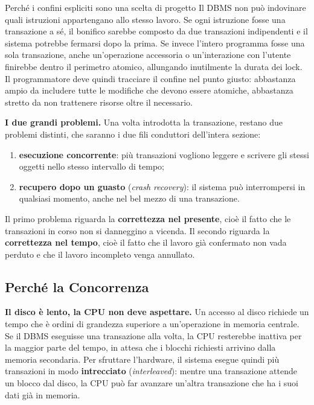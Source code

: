 \documentclass[12pt]{extarticle}
\begin{document}
\begin{cbox}{Perché i confini espliciti sono una scelta di progetto}
\noindent Il DBMS non può indovinare quali istruzioni appartengano allo stesso lavoro. Se ogni istruzione fosse una transazione a sé, il bonifico sarebbe composto da due transazioni indipendenti e il sistema potrebbe fermarsi dopo la prima. Se invece l'intero programma fosse una sola transazione, anche un'operazione accessoria o un'interazione con l'utente finirebbe dentro il perimetro atomico, allungando inutilmente la durata dei lock. Il programmatore deve quindi tracciare il confine nel punto giusto: abbastanza ampio da includere tutte le modifiche che devono essere atomiche, abbastanza stretto da non trattenere risorse oltre il necessario.
\end{cbox}

\medskip
\noindent \textbf{I due grandi problemi.} Una volta introdotta la transazione, restano due problemi distinti, che saranno i due fili conduttori dell'intera sezione:
\begin{enumerate}
    \item \textbf{esecuzione concorrente}: più transazioni vogliono leggere e scrivere gli stessi oggetti nello stesso intervallo di tempo;
    \item \textbf{recupero dopo un guasto} (\textit{crash recovery}): il sistema può interrompersi in qualsiasi momento, anche nel bel mezzo di una transazione.
\end{enumerate}
Il primo problema riguarda la \textbf{correttezza nel presente}, cioè il fatto che le transazioni in corso non si danneggino a vicenda. Il secondo riguarda la \textbf{correttezza nel tempo}, cioè il fatto che il lavoro già confermato non vada perduto e che il lavoro incompleto venga annullato.

\subsection{Perché la Concorrenza}

\noindent \textbf{Il disco è lento, la CPU non deve aspettare.} Un accesso al disco richiede un tempo che è ordini di grandezza superiore a un'operazione in memoria centrale. Se il DBMS eseguisse una transazione alla volta, la CPU resterebbe inattiva per la maggior parte del tempo, in attesa che i blocchi richiesti arrivino dalla memoria secondaria. Per sfruttare l'hardware, il sistema esegue quindi più transazioni in modo \textbf{intrecciato} (\textit{interleaved}): mentre una transazione attende un blocco dal disco, la CPU può far avanzare un'altra transazione che ha i suoi dati già in memoria.
\end{document}
